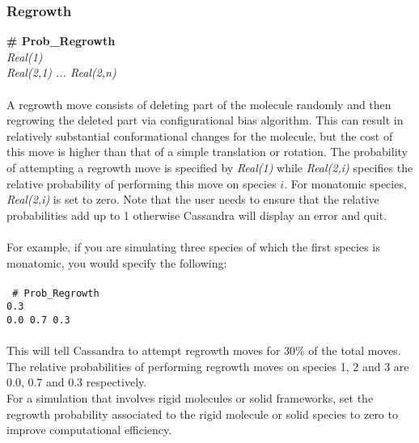 \subsubsection{Regrowth}
{\bf \# Prob\_Regrowth} \\
{\it Real(1)} \\ 
{\it Real(2,1) ... Real(2,n)} \\ \\
%
A regrowth move consists of deleting part of the molecule randomly and
then regrowing the deleted part via configurational bias algorithm.
This can result in relatively substantial conformational changes for
the molecule, but the cost of this move is higher than that of a
simple translation or rotation. The probability of attempting a
regrowth move is specified by {\it Real(1)} while {\it Real(2,i)}
specifies the relative probability of performing this move on species
$i$. For monatomic species, {\it Real(2,i)} is set to zero. Note that
the user needs to ensure that the relative probabilities add 
up to 1 otherwise Cassandra will display an error and quit. \\ \\
% 
For example, if you are simulating three species of which the first
species is monatomic, you would specify the following: \\ \\ 
%
\texttt{
\# Prob\_Regrowth \\
0.3 \\
0.0 0.7 0.3 } \\ \\
%
This will tell Cassandra to attempt regrowth moves for 30\% of the total moves. The relative probabilities of
performing regrowth moves on species 1, 2 and 3 are 0.0, 0.7 and 0.3 respectively.  \\

For a simulation that involves rigid molecules or solid frameworks, set the
regrowth probability associated to the rigid molecule or solid species to zero to improve computational efficiency.
%
%
